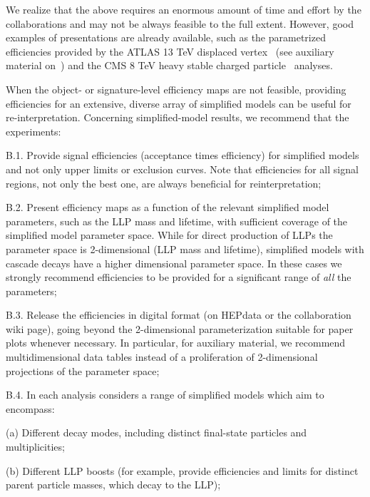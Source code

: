 \noindent
We realize that the above requires an enormous amount of time and effort by
the collaborations and may not be always feasible to the full extent.
However, good examples of presentations are already available, such as
the parametrized efficiencies provided by the ATLAS 13 TeV displaced
vertex~\cite{Aaboud:2017iio} (see auxiliary material on~\cite{SUSY-2016-08}) and the CMS 8 TeV heavy stable
charged particle~\cite{Khachatryan:2015lla} analyses.

When the object- or signature-level efficiency maps are not feasible, providing efficiencies for an extensive, diverse array of simplified models can be
useful for re-interpretation.
Concerning simplified-model results, we recommend that the experiments:
\begin{description*}
  \item[B.1.] Provide signal efficiencies  (acceptance times efficiency) for
  simplified models and not only upper limits or exclusion curves.
  Note that efficiencies for all signal regions, not only the best one, are always beneficial for reinterpretation;
  \item[B.2.] Present efficiency maps as a function of the relevant simplified model parameters, such as the LLP mass and lifetime, with sufficient coverage of the simplified model parameter space. While for direct production of LLPs the parameter space is 2-dimensional
  (LLP mass and lifetime), simplified models with cascade decays have a higher dimensional parameter space. In these cases we strongly recommend
  efficiencies to be provided for a significant range of {\it all} the
  parameters;
  \item[B.3.] Release the efficiencies in digital format (on HEPdata or the collaboration wiki page), going beyond the 2-dimensional parameterization suitable for paper plots whenever necessary. In particular, for auxiliary material, we recommend multidimensional data tables instead of a proliferation of 2-dimensional projections
  of the parameter space;
  \item[B.4.] In each analysis considers a range of simplified models which aim to encompass:
\begin{description*}
    \item[(a)] Different decay modes, including distinct final-state particles and multiplicities;
    \item[(b)] Different LLP boosts (for example, provide efficiencies and limits
        for distinct parent particle masses, which decay to the LLP);
\end{description*}
\end{description*}

